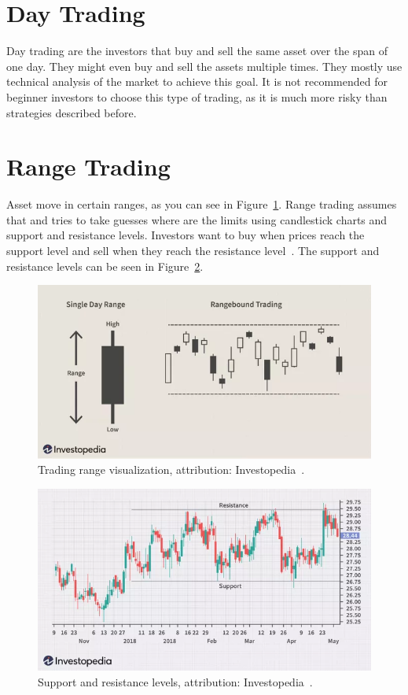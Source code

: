 \section{Day Trading}
Day trading are the investors that buy and sell the same asset over the span of one day. They might even buy and sell the assets multiple times. They mostly use technical analysis of the market to achieve this goal. It is not recommended for beginner investors to choose this type of trading, as it is much more risky than strategies described before.

\section{Range Trading}
\label{section-range-trading}
Asset move in certain ranges, as you can see in Figure~\ref{trading-range-figure}. Range trading assumes that and tries to take guesses where are the limits using candlestick charts and support and resistance levels. Investors want to buy when prices reach the support level and sell when they reach the resistance level~\cite{5types-of-daytrading}. The support and resistance levels can be seen in Figure~\ref{sup-and-res-levels}.

\begin{figure}[!t]
    \centering
    \includegraphics[width=\columnwidth]{figures/trading-range.png}
    \caption{Trading range visualization, attribution: Investopedia~\cite{investopedia:trading-range}.}
    \label{trading-range-figure}
\end{figure}

\begin{figure}[!t]
    \centering
    \includegraphics[width=\columnwidth]{figures/dotdash-final-trading-range.png}
    \caption{Support and resistance levels, attribution: Investopedia~\cite{investopedia:trading-range}.}
    \label{sup-and-res-levels}
\end{figure}

